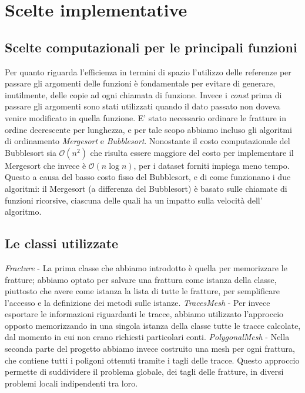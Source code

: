 \chapter{Scelte implementative}

\section{Scelte computazionali per le principali funzioni}
Per quanto riguarda l'efficienza in termini di spazio l'utilizzo delle referenze per passare gli argomenti delle funzioni è fondamentale per evitare di generare, inutilmente, delle copie ad ogni chiamata di funzione. \newline
Invece i \textit{const} prima di passare gli argomenti sono stati utilizzati quando il dato passato non doveva venire modificato in quella funzione. \newline
E' stato necessario ordinare le fratture in ordine decrescente per lunghezza, e per tale scopo abbiamo incluso gli algoritmi di ordinamento \textit{Mergesort} e \textit{Bubblesort}. \newline
Nonostante il costo computazionale del Bubblesort sia $\mathcal{O}(n^2)$ che risulta essere maggiore del costo per implementare il Mergesort che invece è $\mathcal{O}(n \log n) $, per i dataset forniti impiega meno tempo. Questo a causa del basso costo fisso del Bubblesort, e di come funzionano i due algoritmi: il Mergesort (a differenza del Bubblesort) è basato sulle chiamate di funzioni ricorsive, ciascuna delle quali ha un impatto sulla velocità dell' algoritmo.


\section{Le classi utilizzate}
\textit{Fracture} - La prima classe che abbiamo introdotto è quella per memorizzare le fratture; abbiamo optato per salvare una frattura come istanza della classe, piuttosto che avere come istanza la lista di tutte le fratture, per semplificare l'accesso e la definizione dei metodi sulle istanze. \newline
\textit{TracesMesh} - Per invece esportare le informazioni riguardanti le tracce, abbiamo utilizzato l'approccio opposto memorizzando in una singola istanza della classe tutte le tracce calcolate, dal momento in cui non erano richiesti particolari conti. \newline
\textit{PolygonalMesh} - Nella seconda parte del progetto abbiamo invece costruito una mesh per ogni frattura, che contiene tutti i poligoni ottenuti tramite i tagli delle tracce. Questo approccio permette di suddividere il problema globale, dei tagli delle fratture, in diversi problemi locali indipendenti tra loro.


